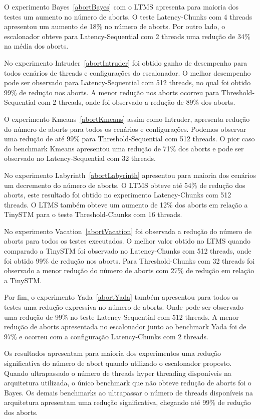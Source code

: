 \documentclass[diss,capa]{texufpel}
\begin{document}
O experimento Bayes~\ref{abortBayes} com o LTMS apresenta para maioria dos testes um aumento no número de aborts. O teste Latency-Chunks com 4 threads apresentou um aumento de 18\% no número de aborts. Por outro lado, o escalonador obteve para Latency-Sequential com 2 threads uma redução de 34\% na média dos aborts.

No experimento Intruder~\ref{abortIntruder} foi obtido ganho de desempenho para todos cenários de threads e configurações do escalonador. O melhor desempenho pode ser observado para Latency-Sequential com 512 threads, no qual foi obtido 99\% de redução nos aborts. A menor redução nos aborts ocorreu para Threshold-Sequential com 2 threads, onde foi observado a redução de 89\% dos aborts.

O experimento Kmeans~\ref{abortKmeans} assim como Intruder, apresenta redução do número de aborts para todos os cenários e configurações. Podemos observar uma redução de até 99\% para Threshold-Sequential com 512 threads. O pior caso do benchmark Kmeans apresentou uma redução de 71\% dos aborts e pode ser observado no Latency-Sequential com 32 threads.



No experimento Labyrinth~\ref{abortLabyrinth} apresentou para maioria dos cenários um decremento do número de aborts. O LTMS obteve até 54\% de redução dos aborts, este resultado foi obtido no experimento Latency-Chunks com 512 threads. O LTMS também obteve um aumento de 12\% dos aborts em relação a TinySTM para o teste Threshold-Chunks com 16 threads.

No experimento Vacation~\ref{abortVacation} foi observada a redução do número de aborts para todos os testes executados. O melhor valor obtido no LTMS quando comparado a TinySTM foi observado no Latency-Chunks com 512 threads, onde foi obtido 99\% de redução nos aborts. Para Threshold-Chunks com 32 threads foi observado a menor redução do número de aborts com 27\% de redução em relação a TinySTM.

Por fim, o experimento Yada~\ref{abortYada} também apresentou para todos os testes uma redução expressiva no número de aborts. Onde pode ser observado uma redução de 99\% no teste Latency-Sequential com 512 threads. A menor redução de aborts apresentada no escalonador junto ao benchmark Yada foi de 97\% e ocorreu com a configuração Latency-Chunks com 2 threads.

Os resultados apresentam para maioria dos experimentos uma redução significativa do número de abort quando utilizado o escalonador proposto. Quando ultrapassado o número de threads hyper threading disponíveis na arquitetura utilizada, o único benchmark que não obteve redução de aborts foi o Bayes. Os demais benchmarks ao ultrapassar o número de threads disponíveis na arquitetura apresentam uma redução significativa, chegando até 99\% de redução dos aborts.
\end{document}
